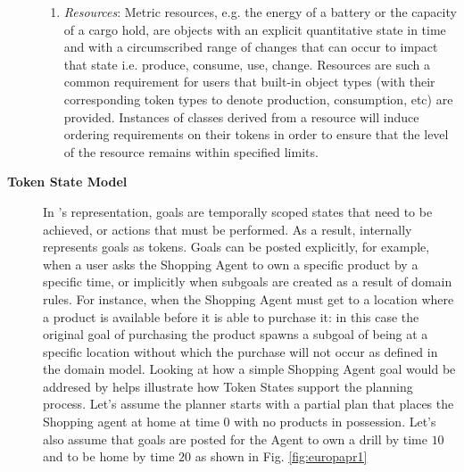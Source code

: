 \begin{description}
\begin{enumerate}
\item \textit{Resources}: Metric resources, e.g. the energy of a
  battery or the capacity of a cargo hold, are objects with an
  explicit quantitative state in time and with a circumscribed range
  of changes that can occur to impact that state i.e. produce,
  consume, use, change.  Resources are such a common requirement for \eu
  users that built-in object types (with their corresponding token
  types to denote production, consumption, etc) are provided.
  Instances of classes derived from a resource will induce ordering
  requirements on their tokens in order to ensure that the level of
  the resource remains within specified limits.

\end{enumerate}

\item[\textbf{Token State Model}] In \eu's representation, goals are
  temporally scoped states that need to be achieved, or actions that
  must be performed. As a result, \eu internally represents goals as
  tokens.  Goals can be posted explicitly, for example, when a user
  asks the Shopping Agent to own a specific product by a specific
  time, or implicitly when subgoals are created as a result of domain
  rules. For instance, when the Shopping Agent must get to a location
  where a product is available before it is able to purchase it: in
  this case the original goal of purchasing the product spawns a
  subgoal of being at a specific location without which the purchase
  will not occur as defined in the domain model.  Looking at how a
  simple Shopping Agent goal would be addresed by \eu helps illustrate
  how Token States support the planning process.  Let's assume the
  planner starts with a partial plan that places the Shopping agent at
  home at time $0$ with no products in possession. Let's also assume
  that goals are posted for the Agent to own a drill by time $10$ and
  to be home by time $20$ as shown in Fig. \ref{fig:europapr1}
  

\end{description}
